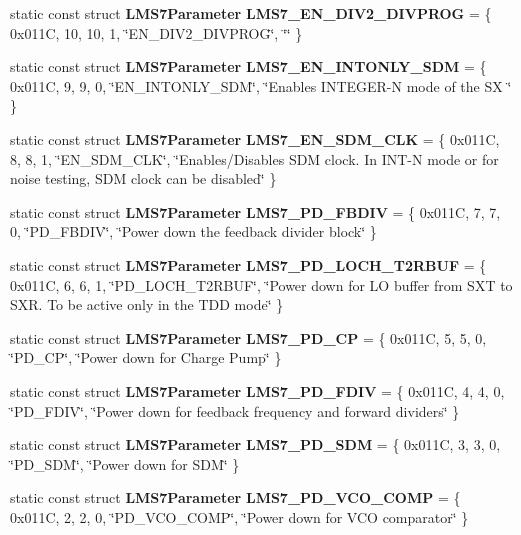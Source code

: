 \begin{DoxyCompactItemize}
\item 
static const struct {\bf L\+M\+S7\+Parameter} {\bf L\+M\+S7\+\_\+\+E\+N\+\_\+\+D\+I\+V2\+\_\+\+D\+I\+V\+P\+R\+OG} = \{ 0x011\+C, 10, 10, 1, \char`\"{}\+E\+N\+\_\+\+D\+I\+V2\+\_\+\+D\+I\+V\+P\+R\+O\+G\char`\"{}, \char`\"{}\char`\"{} \}
\item 
static const struct {\bf L\+M\+S7\+Parameter} {\bf L\+M\+S7\+\_\+\+E\+N\+\_\+\+I\+N\+T\+O\+N\+L\+Y\+\_\+\+S\+DM} = \{ 0x011\+C, 9, 9, 0, \char`\"{}\+E\+N\+\_\+\+I\+N\+T\+O\+N\+L\+Y\+\_\+\+S\+D\+M\char`\"{}, \char`\"{}\+Enables I\+N\+T\+E\+G\+E\+R-\/\+N mode of the S\+X \char`\"{} \}
\item 
static const struct {\bf L\+M\+S7\+Parameter} {\bf L\+M\+S7\+\_\+\+E\+N\+\_\+\+S\+D\+M\+\_\+\+C\+LK} = \{ 0x011\+C, 8, 8, 1, \char`\"{}\+E\+N\+\_\+\+S\+D\+M\+\_\+\+C\+L\+K\char`\"{}, \char`\"{}\+Enables/\+Disables S\+D\+M clock. In I\+N\+T-\/\+N mode or for noise testing, S\+D\+M clock can be disabled\char`\"{} \}
\item 
static const struct {\bf L\+M\+S7\+Parameter} {\bf L\+M\+S7\+\_\+\+P\+D\+\_\+\+F\+B\+D\+IV} = \{ 0x011\+C, 7, 7, 0, \char`\"{}\+P\+D\+\_\+\+F\+B\+D\+I\+V\char`\"{}, \char`\"{}\+Power down the feedback divider block\char`\"{} \}
\item 
static const struct {\bf L\+M\+S7\+Parameter} {\bf L\+M\+S7\+\_\+\+P\+D\+\_\+\+L\+O\+C\+H\+\_\+\+T2\+R\+B\+UF} = \{ 0x011\+C, 6, 6, 1, \char`\"{}\+P\+D\+\_\+\+L\+O\+C\+H\+\_\+\+T2\+R\+B\+U\+F\char`\"{}, \char`\"{}\+Power down for L\+O buffer from S\+X\+T to S\+X\+R. To be active only in the T\+D\+D mode\char`\"{} \}
\item 
static const struct {\bf L\+M\+S7\+Parameter} {\bf L\+M\+S7\+\_\+\+P\+D\+\_\+\+CP} = \{ 0x011\+C, 5, 5, 0, \char`\"{}\+P\+D\+\_\+\+C\+P\char`\"{}, \char`\"{}\+Power down for Charge Pump\char`\"{} \}
\item 
static const struct {\bf L\+M\+S7\+Parameter} {\bf L\+M\+S7\+\_\+\+P\+D\+\_\+\+F\+D\+IV} = \{ 0x011\+C, 4, 4, 0, \char`\"{}\+P\+D\+\_\+\+F\+D\+I\+V\char`\"{}, \char`\"{}\+Power down for feedback frequency and forward dividers\char`\"{} \}
\item 
static const struct {\bf L\+M\+S7\+Parameter} {\bf L\+M\+S7\+\_\+\+P\+D\+\_\+\+S\+DM} = \{ 0x011\+C, 3, 3, 0, \char`\"{}\+P\+D\+\_\+\+S\+D\+M\char`\"{}, \char`\"{}\+Power down for S\+D\+M\char`\"{} \}
\item 
static const struct {\bf L\+M\+S7\+Parameter} {\bf L\+M\+S7\+\_\+\+P\+D\+\_\+\+V\+C\+O\+\_\+\+C\+O\+MP} = \{ 0x011\+C, 2, 2, 0, \char`\"{}\+P\+D\+\_\+\+V\+C\+O\+\_\+\+C\+O\+M\+P\char`\"{}, \char`\"{}\+Power down for V\+C\+O comparator\char`\"{} \}

\end{DoxyCompactItemize}
